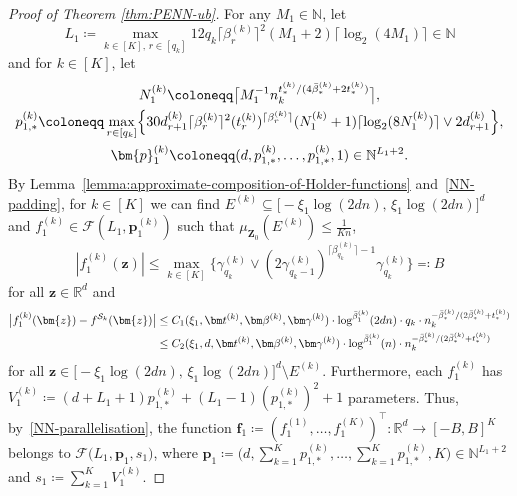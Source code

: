 \documentclass[12pt]{article}
\begin{document}
\begin{proof}[Proof of Theorem \ref{thm:PENN-ub}]
    For any $M_1 \in \mathbb{N}$, let 
    \[
    L_1 \coloneqq \max_{k\in[K],\, r\in[q_k]} 12q_k\lceil \beta^{(k)}_r \rceil^2 (M_1+2) \lceil\log_2(4M_1)\rceil \in \mathbb{N}
    \]
    and for $k \in [K]$, let
    \begin{gather*}
        N^{(k)}_1 \coloneqq \bigl\lceil M_1^{-1} n_k^{t^{(k)}_* / (4\bar\beta^{(k)}_* + 2t^{(k)}_*)} \bigr\rceil,\\
        p^{(k)}_{1,*} \coloneqq \max_{r\in[q_k]} \Bigl\{ 30 d_{r+1}^{(k)} \lceil\beta^{(k)}_r\rceil^2 (t^{(k)}_r)^{\lceil\beta^{(k)}_r\rceil} (N^{(k)}_1+1) \lceil\log_2(8N^{(k)}_1)\rceil \vee 2d_{r+1}^{(k)} \Bigr\},\\
        \bm{p}^{(k)}_1 \coloneqq (d,p^{(k)}_{1,*},\ldots,p^{(k)}_{1,*},1) \in \mathbb{N}^{L_1+2}.
    \end{gather*}
    By Lemma~\ref{lemma:approximate-composition-of-Holder-functions} and~\ref{NN-padding}, for $k \in [K]$ we can find $E^{(k)} \subseteq \bigl[-\xi_1\log(2dn),\,\xi_1\log(2dn)\bigr]^d$ and $f^{(k)}_1 \in \mathcal{F}(L_1,\bm{p}^{(k)}_1)$ such that $\mu_{\bm Z_0}(E^{(k)}) \leq \frac{1}{Kn}$, 
    \[
    |f^{(k)}_1(\bm z)| \leq \max_{k\in[K]} \bigl\{\gamma_{q_k}^{(k)} \vee (2\gamma_{q_k-1}^{(k)})^{\lceil\beta_{q_k}^{(k)}\rceil-1} \gamma_{q_k}^{(k)}\bigr\} \eqqcolon B
    \]
    for all $\bm z \in \mathbb{R}^d$ and 
    \begin{align}
        \bigl|f^{(k)}_1(\bm{z}) - f^{\mathcal{S}_k}(\bm{z})\bigr| & \leq  C_1(\xi_1, \bm t^{(k)}, \bm \beta^{(k)}, \bm \gamma^{(k)}) \cdot \log^{\bar{\beta}_1^{(k)}} (2dn) \cdot q_k \cdot n_k^{-\bar\beta^{(k)}_* / (2\bar\beta^{(k)}_* + t^{(k)}_*)}\nonumber\\
        & \leq C_2(\xi_1, d, \bm t^{(k)}, \bm \beta^{(k)}, \bm \gamma^{(k)}) \cdot \log^{\bar{\beta}_1^{(k)}}(n) \cdot n_k^{-\bar\beta^{(k)}_* / (2\bar\beta^{(k)}_* + t^{(k)}_*)} \label{eq:approx-error-for-f^{S_k}}
    \end{align}
    for all $\bm{z}\in \bigl[-\xi_1\log(2dn),\,\xi_1\log(2dn)\bigr]^d \setminus E^{(k)}$.  
    Furthermore, each $f^{(k)}_1$ has $V^{(k)}_1 \coloneqq (d+L_1+1)p^{(k)}_{1,*} + (L_1-1)(p_{1,*}^{(k)})^2 + 1$ parameters. Thus, by~\ref{NN-parallelisation}, the function $\bm{f}_1 \coloneqq (f^{(1)}_1, \ldots, f^{(K)}_1)^\top : \mathbb{R}^d \to [-B,B]^K$ belongs to $\mathcal{F}\bigl(L_1, \bm{p}_1, s_1 \bigr)$, where $\bm{p}_1 \coloneqq \bigl(d, \sum_{k=1}^K p^{(k)}_{1,*}, \ldots, \sum_{k=1}^K p^{(k)}_{1,*}, K\bigr) \in \mathbb{N}^{L_1+2}$ and $s_1 \coloneqq \sum_{k=1}^K V^{(k)}_1$. 


\end{proof}
\end{document}
